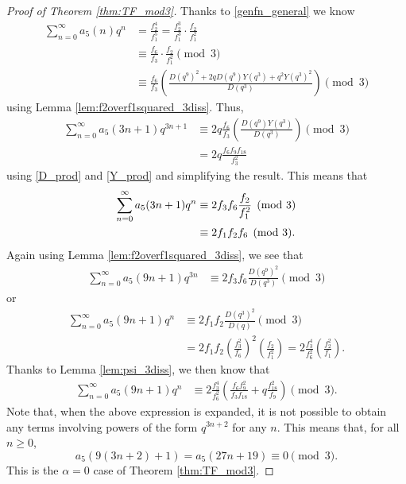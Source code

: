 \documentclass[10pt, reqno]{amsart}
\theoremstyle{theorem}
\theoremstyle{definition}
\theoremstyle{example}
\begin{document}
\begin{proof}[Proof of Theorem  \ref{thm:TF_mod3}]
Thanks to \eqref{genfn_general} we know 
\begin{align*}
\sum_{n=0}^\infty a_5(n)q^n 
&= 
\frac{f_2^4}{f_1^5} = 
\frac{f_2^3}{f_1^3}\cdot \frac{f_2}{f_1^2} \\
&\equiv 
\frac{f_6}{f_3}\cdot \frac{f_2}{f_1^2} \pmod{3}  \\
&\equiv 
\frac{f_6}{f_3}\left( \frac{D(q^9)^2 +2qD(q^9)Y(q^3)+q^2Y(q^3)^2}{D(q^3)}  \right) \pmod{3} 
\end{align*}
using Lemma \ref{lem:f2overf1squared_3diss}.  
Thus, 
\begin{align*}
\sum_{n=0}^\infty a_5(3n+1)q^{3n+1} 
&\equiv 
2q\frac{f_6}{f_3}\left( \frac{D(q^9)Y(q^3)}{D(q^3)}  \right) \pmod{3}  \\
&= 
2q\frac{f_6f_9f_{18}}{f_3^2}
\end{align*}
using \eqref{D_prod} and \eqref{Y_prod} and simplifying the result.  This means that
\begin{align}
\sum_{n=0}^\infty a_5(3n+1)q^{n} 
&\equiv 
2f_3f_{6} \frac{f_2}{f_1^2} \pmod{3} \notag \\
&\equiv
2f_1f_2f_6 \pmod{3}.  \label{3n1_mod3}
\end{align}
Again using Lemma \ref{lem:f2overf1squared_3diss}, we see that 
\begin{align*}
\sum_{n=0}^\infty a_5(9n+1)q^{3n} 
&\equiv 
2f_3f_{6} \frac{D(q^9)^2}{D(q^3)} \pmod{3}
\end{align*}
or 
\begin{align*}
\sum_{n=0}^\infty a_5(9n+1)q^{n} 
&\equiv 
2f_1f_{2}\frac{D(q^3)^2}{D(q)} \pmod{3} \\
&= 
2f_1f_2\left( \frac{f_3^2}{f_6}\right)^2 \left( \frac{f_2}{f_1^2} \right)  = 
2\frac{f_3^4}{f_6^2}\left( \frac{f_2^2}{f_1} \right).
\end{align*}
Thanks to Lemma \ref{lem:psi_3diss}, we then know that 
\begin{align*}
\sum_{n=0}^\infty a_5(9n+1)q^{n} 
&\equiv 
2\frac{f_3^4}{f_6^2}\left( \frac{f_6f_9^2}{f_3f_{18}} +q\frac{f_{18}^2}{f_9} \right) \pmod{3}.
\end{align*}
Note that, when the above expression is expanded, it is not possible to obtain any terms involving powers of the form $q^{3n+2}$ for any $n$.  This means that, for all $n\geq 0$, 
\begin{equation*}
\label{27n19_mod3} 
a_5(9(3n+2)+1) = a_5(27n+19) \equiv 0 \pmod{3}. 
\end{equation*}
This is the $\alpha=0$ case of Theorem \ref{thm:TF_mod3}.  


\end{proof}
\end{document}
